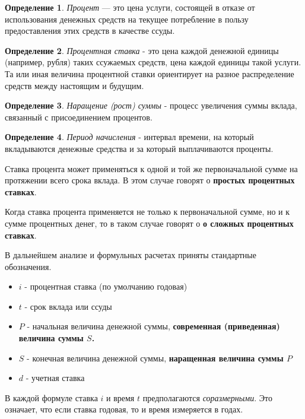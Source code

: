 \documentclass[aps,%
12pt,%
final,%
oneside,
onecolumn,%
musixtex, %
superscriptaddress,%
centertags]{article} %
\theoremstyle{plain}
\theoremstyle{definition}
\newtheorem{definition}{Определение}[subsection]
\theoremstyle{remark}
\begin{document}
\begin{definition}
	\textit{Процент} — это цена услуги, состоящей в отказе от использования денежных средств на текущее потребление в пользу предоставления этих средств в качестве ссуды.
\end{definition}

\begin{definition}
\textit{Процентная ставка} - это цена каждой денежной единицы (например, рубля) таких ссужаемых средств, цена каждой единицы такой услуги. Та или иная величина процентной ставки ориентирует на разное распределение средств между настоящим и будущим.
\end{definition}


\begin{definition}
\textit{Наращение (рост) суммы} - процесс увеличения суммы вклада, связанный с присоединением процентов.
\end{definition}

\begin{definition}
\textit{Период начисления} - интервал времени, на который вкладываются денежные средства и за который выплачиваются проценты.
\end{definition}

Ставка процента может применяться к одной и той же первоначальной сумме на протяжении всего срока вклада. В этом случае говорят о \textbf{простых процентных ставках}.

Когда ставка процента применяется не только к первоначальной сумме, но и к сумме процентных денег, то в таком случае говорят о \textbf{о сложных процентных ставках}.

В дальнейшем анализе и формульных расчетах приняты стандартные обозначения.

\begin{itemize} 
  \item $i$ - процентная ставка (по умолчанию годовая)
  \item $t$ - срок вклада или ссуды
  \item $P$ - начальная величина денежной суммы, \textbf{современная (приведенная) величина суммы $S$.}
  \item $S$ - конечная величина денежной суммы, \textbf{наращенная величина суммы $P$}
  \item $d$ - учетная ставка
\end{itemize}

В каждой формуле ставка $i$ и время $t$ предполагаются \textit{соразмерными}. Это означает, что если ставка годовая, то и время измеряется в годах.
\end{document}
